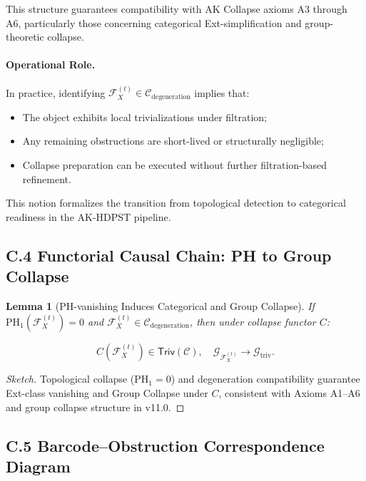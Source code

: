\documentclass[11pt]{article}
\newtheorem{lemma}[theorem]{Lemma}
\begin{document}
This structure guarantees compatibility with AK Collapse axioms A3 through A6, particularly those concerning categorical Ext-simplification and group-theoretic collapse.

\paragraph{Operational Role.}  
In practice, identifying \( \mathcal{F}_X^{(t)} \in \mathcal{C}_{\mathrm{degeneration}} \) implies that:
\begin{itemize}
    \item The object exhibits local trivializations under filtration;
    \item Any remaining obstructions are short-lived or structurally negligible;
    \item Collapse preparation can be executed without further filtration-based refinement.
\end{itemize}

This notion formalizes the transition from topological detection to categorical readiness in the AK-HDPST pipeline.



\subsection*{C.4 Functorial Causal Chain: PH to Group Collapse}

\begin{lemma}[PH-vanishing Induces Categorical and Group Collapse]
If \( \mathrm{PH}_1(\mathcal{F}_X^{(t)}) = 0 \) and \( \mathcal{F}_X^{(t)} \in \mathcal{C}_{\mathrm{degeneration}} \), then under collapse functor \( C \):

\[
C(\mathcal{F}_X^{(t)}) \in \mathsf{Triv}(\mathcal{C}), \quad \mathcal{G}_{\mathcal{F}_X^{(t)}} \longrightarrow \mathcal{G}_{\mathrm{triv}}.
\]
\end{lemma}

\begin{proof}[Sketch]
Topological collapse (\( \mathrm{PH}_1 = 0 \)) and degeneration compatibility guarantee Ext-class vanishing and Group Collapse under \( C \), consistent with Axioms A1–A6 and group collapse structure in v11.0.
\end{proof}

\subsection*{C.5 Barcode–Obstruction Correspondence Diagram}
\end{document}
